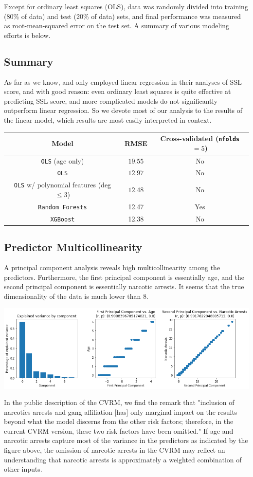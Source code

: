 %
Except for ordinary least squares (OLS), data was randomly divided into training (80\% of data) and test (20\% of data) sets, and final performance was measured as root-mean-squared error on the test set. A summary of various modeling efforts is below.
\subsection{Summary}
As far as we know, \cite{nyt} and \cite{upturn} only employed linear regression in their analyses of SSL score,  and with good reason: even ordinary least squares is quite effective at predicting SSL score, and more complicated models do not significantly outperform linear regression. So we devote most of our analysis to the results of the linear model, which results are most easily interpreted in context.
\begin{table}[h!]
\centering
\begin{tabular}{||c c c||}
 \hline
 Model & RMSE & Cross-validated (\texttt{nfolds}$=5$)\\ [0.5ex] 
 \hline\hline
\texttt{OLS} (age only) & $19.55$ & No\\
\texttt{OLS} & $12.97$ & No\\
\texttt{OLS} w/ polynomial features (deg $\leq 3$) & $12.48$ & No\\
\texttt{Random Forests} & 12.47 & Yes\\
\texttt{XGBoost} & 12.38 & No\\
 \hline
\end{tabular}
\label{table:2}
\end{table}
\subsection{Predictor Multicollinearity} 
A principal component analysis reveals high multicollinearity among the predictors. Furthermore, the first principal component is essentially age, and the second principal component is essentially narcotic arrests. It seems that the true dimensionality of the data is much lower than 8.\\
\centerline{\includegraphics[scale=.55]{images/pca.png}}
In the public description of the CVRM, we find the remark that "inclusion of narcotics arrests and gang affiliation [has] only marginal impact on the results beyond what the model discerns from the other risk factors; therefore, in the current CVRM version, these two risk factors have been omitted."\cite{factsheet} If age and narcotic arrests capture most of the variance in the predictors as indicated by the figure above, the omission of narcotic arrests in the CVRM may reflect an understanding that narcotic arrests is approximately a weighted combination of other inputs.
